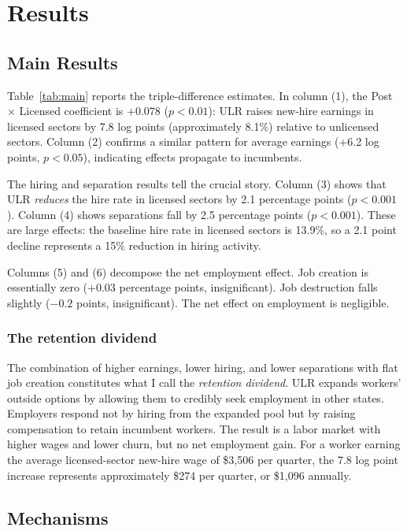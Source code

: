 \documentclass[12pt]{article}
\begin{document}
\section{Results}
\label{sec:results}

\subsection{Main Results}



Table~\ref{tab:main} reports the triple-difference estimates. In column (1), the Post $\times$ Licensed coefficient is $+0.078$ ($p < 0.01$): ULR raises new-hire earnings in licensed sectors by 7.8 log points (approximately 8.1\%) relative to unlicensed sectors. Column (2) confirms a similar pattern for average earnings (+6.2 log points, $p < 0.05$), indicating effects propagate to incumbents.

The hiring and separation results tell the crucial story. Column (3) shows that ULR \emph{reduces} the hire rate in licensed sectors by 2.1 percentage points ($p < 0.001$). Column (4) shows separations fall by 2.5 percentage points ($p < 0.001$). These are large effects: the baseline hire rate in licensed sectors is 13.9\%, so a 2.1 point decline represents a 15\% reduction in hiring activity.

Columns (5) and (6) decompose the net employment effect. Job creation is essentially zero ($+0.03$ percentage points, insignificant). Job destruction falls slightly ($-0.2$ points, insignificant). The net effect on employment is negligible.

\subsubsection*{The retention dividend} The combination of higher earnings, lower hiring, and lower separations with flat job creation constitutes what I call the \emph{retention dividend}. ULR expands workers' outside options by allowing them to credibly seek employment in other states. Employers respond not by hiring from the expanded pool but by raising compensation to retain incumbent workers. The result is a labor market with higher wages and lower churn, but no net employment gain. For a worker earning the average licensed-sector new-hire wage of \$3,506 per quarter, the 7.8 log point increase represents approximately \$274 per quarter, or \$1,096 annually.

\subsection{Mechanisms}
\end{document}
